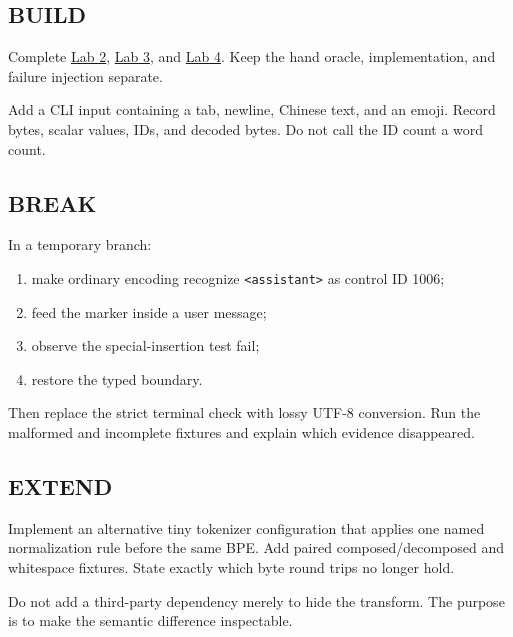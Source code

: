 \subsection{BUILD}\label{build-1}

Complete
\href{https://github.com/hermonai/inside-the-llm-engine/blob/astra-visual-rewrite/labs/lab-02-tokenize-by-hand.md}{Lab
2},
\href{https://github.com/hermonai/inside-the-llm-engine/blob/astra-visual-rewrite/labs/lab-03-stream-utf8-across-tokens.md}{Lab
3}, and
\href{https://github.com/hermonai/inside-the-llm-engine/blob/astra-visual-rewrite/labs/lab-04-use-the-wrong-chat-template.md}{Lab
4}. Keep the hand oracle, implementation, and failure injection
separate.

Add a CLI input containing a tab, newline, Chinese text, and an emoji.
Record bytes, scalar values, IDs, and decoded bytes. Do not call the ID
count a word count.

\subsection{BREAK}\label{break-1}

In a temporary branch:

\begin{enumerate}
\def\labelenumi{\arabic{enumi}.}
\tightlist
\item
  make ordinary encoding recognize
  \texttt{\textless{}\textbar{}assistant\textbar{}\textgreater{}} as
  control ID 1006;
\item
  feed the marker inside a user message;
\item
  observe the special-insertion test fail;
\item
  restore the typed boundary.
\end{enumerate}

Then replace the strict terminal check with lossy UTF-8 conversion. Run
the malformed and incomplete fixtures and explain which evidence
disappeared.

\subsection{EXTEND}\label{extend-1}

Implement an alternative tiny tokenizer configuration that applies one
named normalization rule before the same BPE. Add paired
composed/decomposed and whitespace fixtures. State exactly which byte
round trips no longer hold.

Do not add a third-party dependency merely to hide the transform. The
purpose is to make the semantic difference inspectable.

